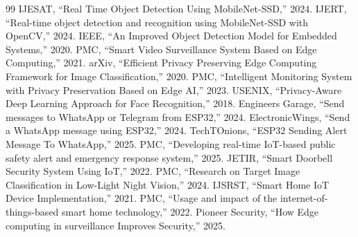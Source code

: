 \documentclass[12pt, a4paper]{article}
\begin{document}
\begin{thebibliography}{99}
 IJESAT, ``Real Time Object Detection Using MobileNet-SSD,'' 2024.
 IJERT, ``Real-time object detection and recognition using MobileNet-SSD with OpenCV,'' 2024.
 IEEE, ``An Improved Object Detection Model for Embedded Systems,'' 2020.
 PMC, ``Smart Video Surveillance System Based on Edge Computing,'' 2021.
 arXiv, ``Efficient Privacy Preserving Edge Computing Framework for Image Classification,'' 2020.
 PMC, ``Intelligent Monitoring System with Privacy Preservation Based on Edge AI,'' 2023.
 USENIX, ``Privacy-Aware Deep Learning Approach for Face Recognition,'' 2018.
 Engineers Garage, ``Send messages to WhatsApp or Telegram from ESP32,'' 2024.
 ElectronicWings, ``Send a WhatsApp message using ESP32,'' 2024.
 TechTOnions, ``ESP32 Sending Alert Message To WhatsApp,'' 2025.
 PMC, ``Developing real-time IoT-based public safety alert and emergency response system,'' 2025.
 JETIR, ``Smart Doorbell Security System Using IoT,'' 2022.
 PMC, ``Research on Target Image Classification in Low-Light Night Vision,'' 2024.
 IJSRST, ``Smart Home IoT Device Implementation,'' 2021.
 PMC, ``Usage and impact of the internet-of-things-based smart home technology,'' 2022.
 Pioneer Security, ``How Edge computing in surveillance Improves Security,'' 2025.
\end{thebibliography}
\end{document}
